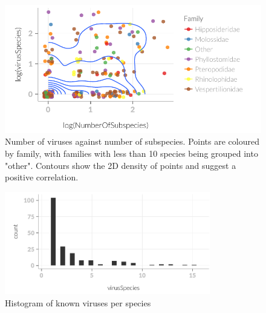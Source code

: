 \begin{knitrout}\footnotesize
{}\color{fgcolor}\begin{figure}[t]

{\centering \includegraphics[width=\textwidth]{figure/subsDataFrame-1} 

}

\caption[Number of viruses against number of subspecies.]{
Number of viruses against number of subspecies.
Points are coloured by family, with families with less than 10 species being grouped into "other".
Contours show the 2D density of points and suggest a positive correlation.
}\label{fig:subsDataFrame}
\end{figure}


\end{knitrout}

\begin{knitrout}\footnotesize
{}\color{fgcolor}\begin{figure}[t]

{\centering \includegraphics[width=0.8\textwidth]{figure/virusHist-1} 

}

\caption[Histogram of known viruses per species]{Histogram of known viruses per species}\label{fig:virusHist}
\end{figure}


\end{knitrout}



